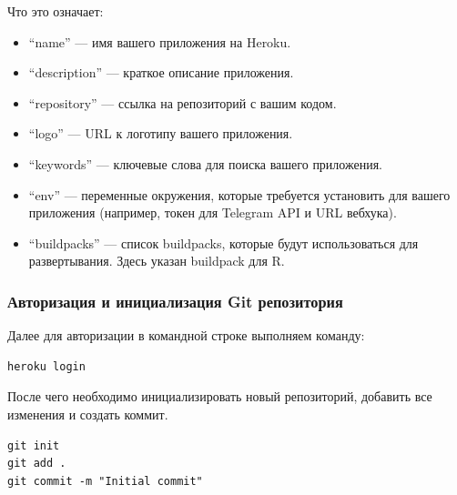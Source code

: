 \documentclass[
]{book}
\providecommand{\tightlist}{%
  \setlength{\itemsep}{0pt}\setlength{\parskip}{0pt}}
\begin{document}
Что это означает:

\begin{itemize}
\tightlist
\item
  ``name'' --- имя вашего приложения на Heroku.
\item
  ``description'' --- краткое описание приложения.
\item
  ``repository'' --- ссылка на репозиторий с вашим кодом.
\item
  ``logo'' --- URL к логотипу вашего приложения.
\item
  ``keywords'' --- ключевые слова для поиска вашего приложения.
\item
  ``env'' --- переменные окружения, которые требуется установить для вашего приложения (например, токен для Telegram API и URL вебхука).
\item
  ``buildpacks'' --- список buildpacks, которые будут использоваться для развертывания. Здесь указан buildpack для R.
\end{itemize}

\subsubsection{Авторизация и инициализация Git репозитория}\label{ux430ux432ux442ux43eux440ux438ux437ux430ux446ux438ux44f-ux438-ux438ux43dux438ux446ux438ux430ux43bux438ux437ux430ux446ux438ux44f-git-ux440ux435ux43fux43eux437ux438ux442ux43eux440ux438ux44f}

Далее для авторизации в командной строке выполняем команду:

\begin{verbatim}
heroku login
\end{verbatim}

После чего необходимо инициализировать новый репозиторий, добавить все изменения и создать коммит.

\begin{verbatim}
git init
git add .
git commit -m "Initial commit"
\end{verbatim}
\end{document}
